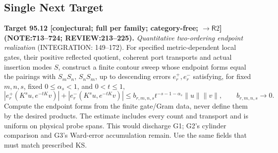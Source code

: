 \subsection{Single Next Target}
\textbf{Target 95.12 [conjectural; full per family; category-free; \(\to\mathsf R2\)]\newline (NOTE:713--724; REVIEW:213--225).}
\emph{Quantitative two-ordering endpoint realization} (INTEGRATION: 149--172). For specified metric-dependent
local gates, their positive reflected quotient, coherent port transports and actual insertion modes \(S\), construct
a finite contour sweep whose endpoint forms equal the pairings with \(S_mS_n\), \(S_nS_m\), up to descending errors
\(e_r^+,e_r^-\) satisfying, for fixed \(m,n,s\), fixed \(0\le\alpha_s<1\), and \(0<t\le1\),
\[
 |e_r^+(K^su,e^{-tK}v)|+|e_r^-(K^su,e^{-tK}v)|
 \le b_{r,m,n,s}t^{-s-1-\alpha_s}\|u\|\|v\|,\qquad b_{r,m,n,s}\longrightarrow0.
\]
Compute the endpoint forms from the finite gate/Gram data, never define them by the desired products.
The estimate includes every count and transport and is uniform on physical probe spans. This would discharge G1;
G2's cylinder comparison and G3's Ward-error accumulation remain. Use the same fields that must match prescribed KS.
